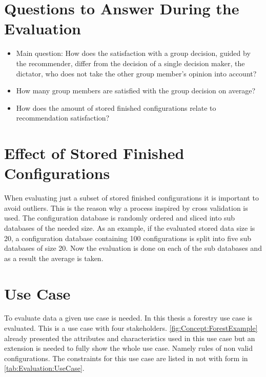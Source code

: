 
\section{Questions to Answer During the Evaluation}
\label{sec:Evaluation:Questions}

\begin{itemize}
    \item Main question: How does the satisfaction with a group decision, guided by the recommender, differ from the decision of a single decision maker, the dictator, who does not take the other group member's opinion into account?
    \item How many group members are satisfied with the group decision on average?
    \item How does the amount of stored finished configurations relate to recommendation satisfaction?
\end{itemize}

\section{Effect of Stored Finished Configurations}
\label{sec:Evaluation:EffectFinishedConfiguration}

When evaluating just a subset of stored finished configurations it is important to avoid outliers. This is the reason why a process inspired by cross validation is used. The configuration database is randomly ordered and sliced into sub databases of the needed size. As an example, if the evaluated stored data size is 20, a configuration database containing 100 configurations is split into five sub databases of size 20. Now the evaluation is done on each of the sub databases and as a result the average is taken.

\section{Use Case}
\label{sec:Evaluation:UseCase}

To evaluate data a given use case is needed. In this thesis a forestry use case is evaluated. This is a use case with four stakeholders. \autoref{fig:Concept:ForestExample} already presented the attributes and characteristics used in this use case but an extension is needed to fully show the whole use case. Namely rules of non valid configurations. The constraints for this use case are listed in not with form in \autoref{tab:Evaluation:UseCase}. 

